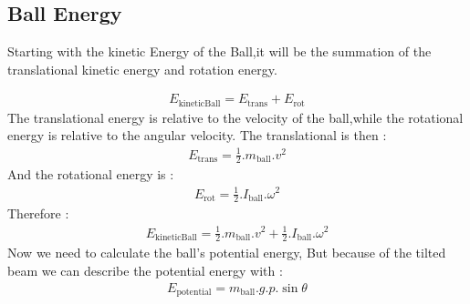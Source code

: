 \documentclass{article}
\begin{document}
\subsection{Ball Energy}

Starting with the kinetic Energy of the Ball,it will be the summation of the translational kinetic energy and rotation energy.

\begin{equation}
	\begin{split}
		E_{\text{kineticBall}} = E_{\text{trans}} + E_{\text{rot}}
	\end{split}
\end{equation}
The translational energy is relative to the velocity of the ball,while the rotational energy is relative to the angular velocity.
The translational is then :
\begin{equation}
	\begin{split}
		E_{\text{trans}} = \frac{1}{2}.m_{\text{ball}}.v^2
	\end{split}	
\end{equation}
And the rotational energy is :
\begin{equation}
	\begin{split}
		E_{\text{rot}} = \frac{1}{2}.I_{\text{ball}}.\omega^2
	\end{split}
\end{equation}
Therefore :
\begin{equation}\label{kineticBall}
	\begin{split}
		E_{\text{kineticBall}} =\frac{1}{2}.m_{\text{ball}}.v^2 + \frac{1}{2}.I_{\text{ball}}.\omega^2
	\end{split}
\end{equation}
Now we need to calculate the ball's potential energy, 
But because of the tilted beam we can describe the potential energy with :
\begin{equation}
	\begin{split}\label{potential}
		E_{\text{potential}} = m_{\text{ball}}.g.p.\sin{\theta}
	\end{split}
\end{equation}


\newpage
\end{document}
